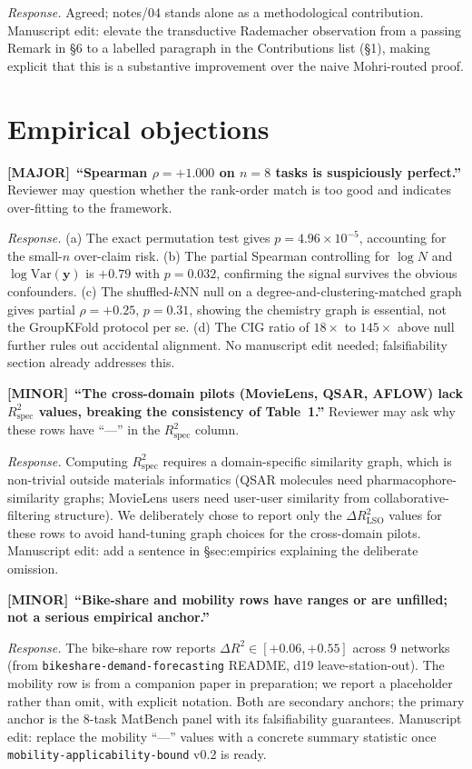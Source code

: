 \documentclass[11pt,a4paper]{article}
\theoremstyle{plain}
\newcommand{\by}{\mathbf{y}}
\newcommand{\Var}{\mathrm{Var}}
\newcommand{\Rspec}{R^2_{\mathrm{spec}}}
\newcommand{\Major}{\textcolor{majorobj}{\textbf{[MAJOR]}}\ }
\newcommand{\Minor}{\textcolor{minorobj}{\textbf{[MINOR]}}\ }
\begin{document}
\emph{Response.}  Agreed; notes/04 stands alone as a methodological
contribution.  Manuscript edit: elevate the transductive Rademacher
observation from a passing Remark in §6 to a labelled paragraph
in the Contributions list (§1), making explicit that this is a
substantive improvement over the naive Mohri-routed proof.

\section{Empirical objections}

\Major \textbf{``Spearman $\rho = +1.000$ on $n = 8$ tasks is
suspiciously perfect.''}  Reviewer may question whether the rank-order
match is too good and indicates over-fitting to the framework.

\emph{Response.}  (a) The exact permutation test gives $p = 4.96 \times
10^{-5}$, accounting for the small-$n$ over-claim risk.  (b) The
partial Spearman controlling for $\log N$ and $\log \Var(\by)$ is
$+0.79$ with $p = 0.032$, confirming the signal survives the obvious
confounders.  (c) The shuffled-$k$NN null on a degree-and-clustering-matched
graph gives partial $\rho = +0.25$, $p = 0.31$, showing the chemistry
graph is essential, not the GroupKFold protocol per se.  (d) The CIG
ratio of $18\times$ to $145\times$ above null further rules out
accidental alignment.  No manuscript edit needed; falsifiability
section already addresses this.

\smallskip
\Minor \textbf{``The cross-domain pilots (MovieLens, QSAR, AFLOW) lack
$\Rspec$ values, breaking the consistency of Table~1.''}  Reviewer may
ask why these rows have ``---'' in the $\Rspec$ column.

\emph{Response.}  Computing $\Rspec$ requires a domain-specific
similarity graph, which is non-trivial outside materials informatics
(QSAR molecules need pharmacophore-similarity graphs; MovieLens users
need user-user similarity from collaborative-filtering structure).  We
deliberately chose to report only the $\Delta R^2_{\mathrm{LSO}}$
values for these rows to avoid hand-tuning graph choices for the
cross-domain pilots.  Manuscript edit: add a sentence in
§sec:empirics explaining the deliberate omission.

\smallskip
\Minor \textbf{``Bike-share and mobility rows have ranges or are
unfilled; not a serious empirical anchor.''}

\emph{Response.}  The bike-share row reports $\Delta R^2 \in [+0.06,
+0.55]$ across 9 networks (from \texttt{bikeshare-demand-forecasting}
README, d19 leave-station-out).  The mobility row is from a
companion paper in preparation; we report a placeholder rather than
omit, with explicit notation.  Both are secondary anchors; the
primary anchor is the 8-task MatBench panel with its falsifiability
guarantees.  Manuscript edit: replace the mobility ``---'' values
with a concrete summary statistic once \texttt{mobility-applicability-bound}
v0.2 is ready.
\end{document}
